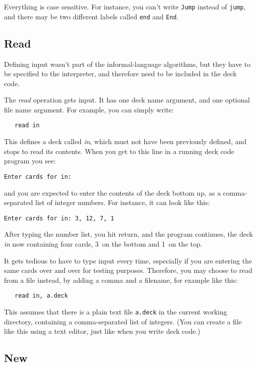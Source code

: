 \documentclass[a4paper,twoside]{tufte-handout}
\begin{document}
Everything is case sensitive. For instance, you can't write
\lstinline!Jump! instead of \lstinline!jump!, and there may be two
different labels called \lstinline!end! and \lstinline!End!.

\subsection{Read}\label{sec-input}

Defining input wasn't part of the informal-language algorithms, but
they have to be specified to the interpreter, and therefore need to be
included in the deck code.

The \emph{read} operation gets input. It has one deck name argument,
and one optional file name argument. For example, you can simply write:
\begin{lstlisting}
   read in
\end{lstlisting}

This defines a deck called \emph{in}, which must not have been
previously defined, and stops to read its contents. When you get to
this line in a running deck code program you see:
\begin{lstlisting}
Enter cards for in: 
\end{lstlisting}
and you are expected to enter the contents of the deck bottom up, as a
comma-separated list of integer numbers. For instance, it can look
like this:
\begin{lstlisting}
Enter cards for in: 3, 12, 7, 1
\end{lstlisting}
After typing the number list, you hit return, and the program
continues, the deck \emph{in} now containing four cards, 3~on the
bottom and 1~on the top.

It gets tedious to have to type input every time, especially if you
are entering the same cards over and over for testing
purposes. Therefore, you may choose to read from a file instead, by
adding a comma and a filename, for example like this:
\begin{lstlisting}
   read in, a.deck
\end{lstlisting}
This assumes that there is a plain text file \lstinline!a.deck! in the
current working directory, containing a comma-separated list of
integers. (You can create a file like this using a text editor, just
like when you write deck code.)

\subsection{New}\label{sec-new}
\end{document}
